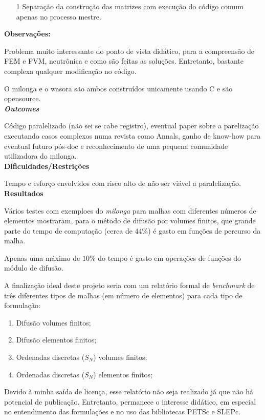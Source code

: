 \begin{itemize}
	\item[1] Separação da construção das matrizes com execução do código comum 
	apenas no processo mestre.
\end{itemize}

\textbf{Observações:}

Problema muito interessante do ponto de vista didático, para a compreensão 
de FEM e FVM, neutrônica e como são feitas as soluções. Entretanto, bastante 
complexa qualquer modificação no código.

O milonga e o wasora são ambos construídos unicamente usando C e são opensource.\\

\textbf{\textit{Outcomes}}

Código paralelizado (não sei se cabe registro), eventual paper sobre a parelização 
executando casos complexos numa revista como Annals, ganho de know-how para eventual futuro pós-doc e reconhecimento de uma pequena comunidade utilizadora 
do milonga.\\

\textbf{Dificuldades/Restrições}

Tempo e esforço envolvidos com risco alto de não ser viável a paralelização.\\

\textbf{Resultados}

Vários testes com exemploes do \textit{milonga} para malhas com diferentes números de elementos mostraram, para o método de difusão por volumes finitos, que grande parte 
do tempo de computação (cerca de $44\%$) é gasto em funções de percurso da malha.

Apenas uma máximo de $10\%$ do tempo é gasto em operações de funções do módulo 
de difusão. 

A finalização ideal deste projeto seria com um relatório formal de \textit{benchmark} de três diferentes tipos de malhas (em número de elementos) 
para cada tipo de formulação:

\begin{enumerate}
\item Difusão volumes finitos;
\item Difusão elementos finitos;
\item Ordenadas discretas ($S_N$) volumes finitos;
\item Ordenadas discretas ($S_N$) elementos finitos;
\end{enumerate}

Devido à minha saída de licença, esse relatório não seja realizado já que não há 
potencial de publicação. Entretanto, permanece o interesse didático, em especial no entendimento das formulações e no uso das bibliotecas PETSc e SLEPc.
